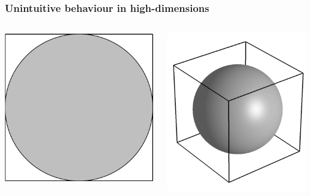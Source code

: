\begin{frame}
\frametitle{Unintuitive behaviour in high-dimensions}
\begin{columns}[c]
\includegraphics[width=.8\textwidth]{circle}\par
\includegraphics[width=\textwidth]{sphere}\par

\end{columns}
\end{frame}
